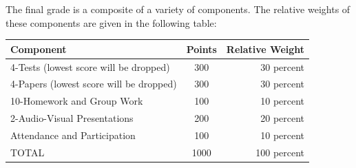 \documentclass{tufte-handout}
\begin{document}
\begin{fullwidth}

The final grade is a composite of a variety of components. The relative weights of these components are given in the following table:

\vspace{0.2in}

\begin{center}
	\begin{tabular}{  l  c  r  }
	  \hline
	  \rowcolor{blue}
	  \textbf{Component} & \textbf{Points} & \textbf{Relative Weight} \\ \hline \hline
	  \rowcolor{lightblue}
	  4-Tests (lowest score will be dropped) & 300 & 30 percent \\ \hline
	  \rowcolor{blue}
	  4-Papers (lowest score will be dropped) & 300 & 30 percent \\ \hline
	  \rowcolor{lightblue}
	  10-Homework and Group Work  & 100 & 10 percent \\ \hline
	  \rowcolor{blue}
	  2-Audio-Visual Presentations & 200 & 20 percent \\ \hline
	  \rowcolor{lightblue}
	  Attendance and Participation & 100 & 10 percent \\ \hline
	  \rowcolor{blue}
	  TOTAL & 1000 & 100 percent \\ 
	  \hline
	\end{tabular}
\end{center}


\end{fullwidth}
\end{document}
